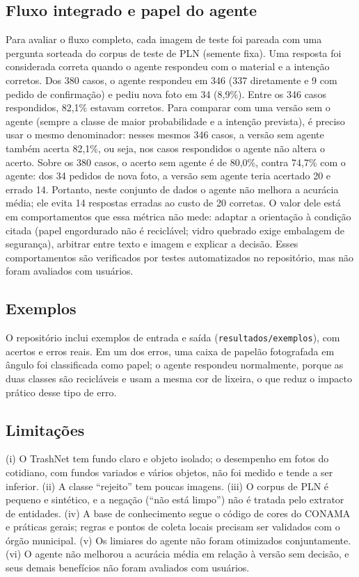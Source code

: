 \documentclass[conference]{IEEEtran}
\begin{document}
\subsection{Fluxo integrado e papel do agente}
Para avaliar o fluxo completo, cada imagem de teste foi pareada com uma pergunta sorteada do corpus de teste de PLN (semente fixa). Uma resposta foi considerada correta quando o agente respondeu com o material e a inten\c{c}\~ao corretos. Dos 380 casos, o agente respondeu em 346 (337 diretamente e 9 com pedido de confirma\c{c}\~ao) e pediu nova foto em 34 (8,9\%). Entre os 346 casos respondidos, 82,1\% estavam corretos. Para comparar com uma vers\~ao sem o agente (sempre a classe de maior probabilidade e a inten\c{c}\~ao prevista), \'e preciso usar o mesmo denominador: nesses mesmos 346 casos, a vers\~ao sem agente tamb\'em acerta 82,1\%, ou seja, nos casos respondidos o agente n\~ao altera o acerto. Sobre os 380 casos, o acerto sem agente \'e de 80,0\%, contra 74,7\% com o agente: dos 34 pedidos de nova foto, a vers\~ao sem agente teria acertado 20 e errado 14. Portanto, neste conjunto de dados o agente n\~ao melhora a acur\'acia m\'edia; ele evita 14 respostas erradas ao custo de 20 corretas. O valor dele est\'a em comportamentos que essa m\'etrica n\~ao mede: adaptar a orienta\c{c}\~ao \`a condi\c{c}\~ao citada (papel engordurado n\~ao \'e recicl\'avel; vidro quebrado exige embalagem de seguran\c{c}a), arbitrar entre texto e imagem e explicar a decis\~ao. Esses comportamentos s\~ao verificados por testes automatizados no reposit\'orio, mas n\~ao foram avaliados com usu\'arios.

\subsection{Exemplos}
O reposit\'orio inclui exemplos de entrada e sa\'ida (\texttt{resultados/exemplos}), com acertos e erros reais. Em um dos erros, uma caixa de papel\~ao fotografada em \^angulo foi classificada como papel; o agente respondeu normalmente, porque as duas classes s\~ao recicl\'aveis e usam a mesma cor de lixeira, o que reduz o impacto pr\'atico desse tipo de erro.

\subsection{Limita\c{c}\~oes}
(i) O TrashNet tem fundo claro e objeto isolado; o desempenho em fotos do cotidiano, com fundos variados e v\'arios objetos, n\~ao foi medido e tende a ser inferior. (ii) A classe ``rejeito'' tem poucas imagens. (iii) O corpus de PLN \'e pequeno e sint\'etico, e a nega\c{c}\~ao (``n\~ao est\'a limpo'') n\~ao \'e tratada pelo extrator de entidades. (iv) A base de conhecimento segue o c\'odigo de cores do CONAMA e pr\'aticas gerais; regras e pontos de coleta locais precisam ser validados com o \'org\~ao municipal. (v) Os limiares do agente n\~ao foram otimizados conjuntamente. (vi) O agente n\~ao melhorou a acur\'acia m\'edia em rela\c{c}\~ao \`a vers\~ao sem decis\~ao, e seus demais benef\'icios n\~ao foram avaliados com usu\'arios.
\end{document}
